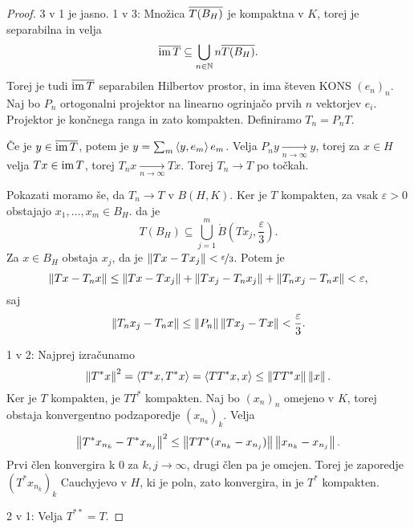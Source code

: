 \begin{proof}
  3 v 1 je jasno.
  1 v 3:
  Množica $\overline{T(B_H)}$ je kompaktna v $K$, torej je separabilna in velja
  \[
	\overline{\operatorname{im} T} \subseteq \bigcup_{n \in \mathbb{N}} n \overline{T(B_H)}.
  \]
  Torej je tudi $\overline{\operatorname{im} T}$ separabilen Hilbertov prostor, in ima števen KONS
  $(e_n)_n$.
  Naj bo $P_n$ ortogonalni projektor na linearno ogrinjačo prvih $n$ vektorjev
  $e_i$.
  Projektor je končnega ranga in zato kompakten.
  Definiramo $T_n = P_n T$.

  Če je $y \in \overline{\operatorname{im} T}$, potem je $y = \sum_m \left< y,e_m \right> e_m$.
  Velja $P_n y \xrightarrow[n \to \infty]{} y$, torej za $x \in H$ velja $Tx \in
  \operatorname{im} T$, torej $T_n x \xrightarrow[n \to \infty]{} Tx$.
  Torej $T_n \to T$ po točkah.

  Pokazati moramo še, da $T_n \to T$ v $B(H,K)$.
  Ker je $T$ kompakten, za vsak $\varepsilon > 0$ obstajajo $x_1, \ldots, x_m
  \in B_H$. da je
  \[
	T(B_H) \subseteq \bigcup_{j=1}^m \mathring{B}(T x_j, \frac{\varepsilon}{3}).
  \]
  Za $x \in B_H$ obstaja $x_j$, da je $\left\lVert Tx - Tx_j\right\rVert <
  \nicefrac{\varepsilon}{3}$.
  Potem je
  \[
	\left\lVert Tx - T_n x\right\rVert
	\le \left\lVert Tx - T x_j\right\rVert + \left\lVert T x_j - T_n x_j\right\rVert + \left\lVert T_n x_j - T_n x\right\rVert
	< \varepsilon,
  \]
  saj
  \[
	\left\lVert T_n x_j - T_n x\right\rVert \le \left\lVert P_n\right\rVert \left\lVert T x_j - Tx\right\rVert <
	\frac{\varepsilon}{3}.
  \]

  1 v 2:
  Najprej izračunamo
  \[
	\left\lVert T^* x\right\rVert^2
	= \left< T^* x, T^* x \right>
	= \left< T T^* x, x \right>
	\le \left\lVert T T^* x\right\rVert \left\lVert x\right\rVert.
  \]
  Ker je $T$ kompakten, je $T T^*$ kompakten.
  Naj bo $(x_n)_n$ omejeno v $K$, torej obstaja konvergentno podzaporedje
  $(x_{n_k})_k$.
  Velja
  \[
	\left\lVert T^* x_{n_k} - T^* x_{n_j}\right\rVert^2
	\le \left\lVert T T^* (x_{n_k} - x_{n_j})\right\rVert \left\lVert x_{n_k} - x_{n_j}\right\rVert.
  \]
  Prvi člen konvergira k $0$ za $k, j \to \infty$, drugi člen pa je omejen.
  Torej je zaporedje $(T^* x_{n_k})_k$ Cauchyjevo v $H$, ki je poln, zato
  konvergira, in je $T^*$ kompakten.

  2 v 1:
  Velja $T^{**} = T$.
\end{proof}


